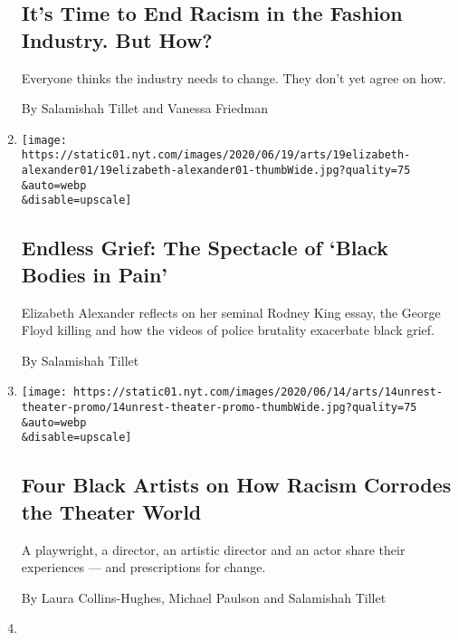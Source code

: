 \begin{enumerate}
{  \subsection{It's Time to End Racism in the Fashion Industry. But
  How?}\label{its-time-to-end-racism-in-the-fashion-industry-but-how}}

  Everyone thinks the industry needs to change. They don't yet agree on
  how.

  By Salamishah Tillet and Vanessa Friedman
\item
  \href{/2020/06/19/arts/elizabeth-alexander-george-floyd-video-protests.html}{}

  \texttt{[image: https://static01.nyt.com/images/2020/06/19/arts/19elizabeth-alexander01/19elizabeth-alexander01-thumbWide.jpg?quality=75\\\&auto=webp\\\&disable=upscale]}

  \hypertarget{endless-grief-the-spectacle-of-black-bodies-in-pain}{%
  \subsection{Endless Grief: The Spectacle of `Black Bodies in
  Pain'}\label{endless-grief-the-spectacle-of-black-bodies-in-pain}}

  Elizabeth Alexander reflects on her seminal Rodney King essay, the
  George Floyd killing and how the videos of police brutality exacerbate
  black grief.

  By Salamishah Tillet
\item
  \href{/2020/06/10/theater/systemic-racism-theater.html}{}

  \texttt{[image: https://static01.nyt.com/images/2020/06/14/arts/14unrest-theater-promo/14unrest-theater-promo-thumbWide.jpg?quality=75\\\&auto=webp\\\&disable=upscale]}

  \hypertarget{four-black-artists-on-how-racism-corrodes-the-theater-world}{%
  \subsection{Four Black Artists on How Racism Corrodes the Theater
  World}\label{four-black-artists-on-how-racism-corrodes-the-theater-world}}

  A playwright, a director, an artistic director and an actor share
  their experiences --- and prescriptions for change.

  By Laura Collins-Hughes, Michael Paulson and Salamishah Tillet
\item
  \href{/2020/06/04/arts/racism-writings-books-movies.html}{}


\end{enumerate}
